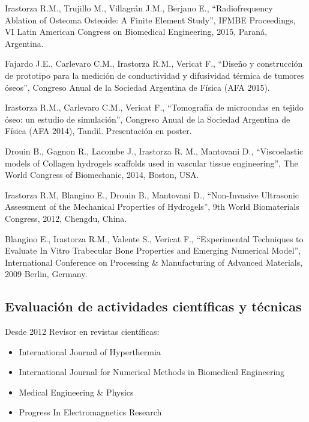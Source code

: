 \documentclass[margin,line]{res}
\begin{document}
\begin{resume}
Irastorza R.M., Trujillo M., Villagrán J.M., Berjano E., ``Radiofrequency Ablation of Osteoma Osteoide: A Finite Element Study'', IFMBE Proceedings, VI Latin American Congress on Biomedical Engineering, 2015, Paraná, Argentina. 

Fajardo J.E., Carlevaro C.M., Irastorza R.M., Vericat F., ``Diseño y construcción de prototipo para la medición de conductividad y difusividad térmica de tumores óseos'', Congreso Anual de la Sociedad Argentina de Física (AFA 2015).

Irastorza R.M., Carlevaro C.M., Vericat F., ``Tomografía de microondas en tejido óseo: un estudio de simulación'', Congreso Anual de la Sociedad Argentina de Física (AFA 2014), Tandil. Presentación en poster.

Drouin B., Gagnon R., Lacombe J., Irastorza R. M., Mantovani D., ``Viscoelastic models of Collagen hydrogels scaffolds used in vascular tissue engineering'', The World Congress of Biomechanic, 2014, Boston, USA.

Irastorza R.M, Blangino E., Drouin B., Mantovani D., ``Non-Invasive Ultrasonic Assessment of the Mechanical Properties of Hydrogels'', 9th World Biomaterials Congress, 2012, Chengdu, China.

Blangino E., Irastorza R.M., Valente S., Vericat F., ``Experimental Techniques to Evaluate In Vitro Trabecular Bone Properties and Emerging Numerical Model'', International Conference on Processing \& Manufacturing of Advanced Materials, 2009 Berlin, Germany.
%
%
%

\subsection{ Evaluación de actividades científicas y técnicas}

Desde 2012 Revisor en revistas científicas:\\
\begin{itemize}
 \item International Journal of Hyperthermia
 \item International Journal for Numerical Methods in Biomedical Engineering
 \item Medical Engineering \& Physics
 \item Progress In Electromagnetics Research
\end{itemize}


\end{resume}
\end{document}

